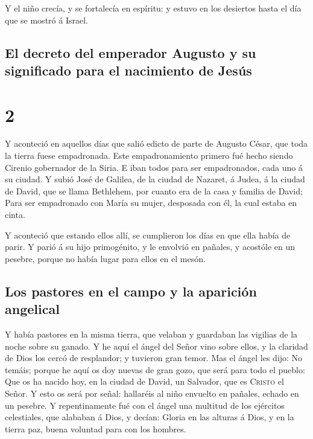  Y el niño crecía, y se fortalecía en espíritu: y estuvo
en los desiertos hasta el día que se mostró á Israel.

\hypertarget{el-decreto-del-emperador-augusto-y-su-significado-para-el-nacimiento-de-jesuxfas}{%
\subsection{El decreto del emperador Augusto y su significado para el
nacimiento de
Jesús}\label{el-decreto-del-emperador-augusto-y-su-significado-para-el-nacimiento-de-jesuxfas}}

\hypertarget{section-42-2}{%
\section{2}\label{section-42-2}}

 Y aconteció en aquellos días que salió edicto de parte de
Augusto César, que toda la tierra fuese empadronada.  Este
empadronamiento primero fué hecho siendo Cirenio gobernador de la Siria.
 E iban todos para ser empadronados, cada uno á su ciudad.
 Y subió José de Galilea, de la ciudad de Nazaret, á
Judea, á la ciudad de David, que se llama Bethlehem, por cuanto era de
la casa y familia de David;  Para ser empadronado con
María su mujer, desposada con él, la cual estaba en cinta.

 Y aconteció que estando ellos allí, se cumplieron los
días en que ella había de parir.  Y parió á su hijo
primogénito, y le envolvió en pañales, y acostóle en un pesebre, porque
no había lugar para ellos en el mesón.

\hypertarget{los-pastores-en-el-campo-y-la-apariciuxf3n-angelical}{%
\subsection{Los pastores en el campo y la aparición
angelical}\label{los-pastores-en-el-campo-y-la-apariciuxf3n-angelical}}

 Y había pastores en la misma tierra, que velaban y
guardaban las vigilias de la noche sobre su ganado.  Y he
aquí el ángel del Señor vino sobre ellos, y la claridad de Dios los
cercó de resplandor; y tuvieron gran temor.  Mas el ángel
les dijo: No temáis; porque he aquí os doy nuevas de gran gozo, que será
para todo el pueblo:  Que os ha nacido hoy, en la ciudad
de David, un Salvador, que es \textsc{Cristo} el Señor. 
Y esto os será por señal: hallaréis al niño envuelto en pañales, echado
en un pesebre.  Y repentinamente fué con el ángel una
multitud de los ejércitos celestiales, que alababan á Dios, y decían:
 Gloria en las alturas á Dios, y en la tierra paz, buena
voluntad para con los hombres.

